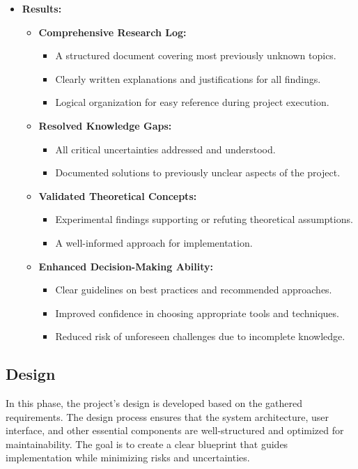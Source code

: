 \documentclass{article}
\begin{document}
\begin{itemize}[leftmargin=*, label={}]
    \item \textbf{Results:}
        \begin{itemize}
            \item \textbf{Comprehensive Research Log:}
                \begin{itemize}
                    \item A structured document covering most previously unknown topics.
                    \item Clearly written explanations and justifications for all findings.
                    \item Logical organization for easy reference during project execution.
                \end{itemize}
            \item \textbf{Resolved Knowledge Gaps:}
                \begin{itemize}
                    \item All critical uncertainties addressed and understood.
                    \item Documented solutions to previously unclear aspects of the project.
                \end{itemize}
            \item \textbf{Validated Theoretical Concepts:}
                \begin{itemize}
                    \item Experimental findings supporting or refuting theoretical assumptions.
                    \item A well-informed approach for implementation.
                \end{itemize}
            \item \textbf{Enhanced Decision-Making Ability:}
                \begin{itemize}
                    \item Clear guidelines on best practices and recommended approaches.
                    \item Improved confidence in choosing appropriate tools and techniques.
                    \item Reduced risk of unforeseen challenges due to incomplete knowledge.
                \end{itemize}
        \end{itemize}
\end{itemize}


\subsection{Design}
In this phase, the project's design is developed based on the gathered requirements.
The design process ensures that the system architecture, user interface, and other essential components are well-structured and optimized for maintainability.
The goal is to create a clear blueprint that guides implementation while minimizing risks and uncertainties.
\end{document}
